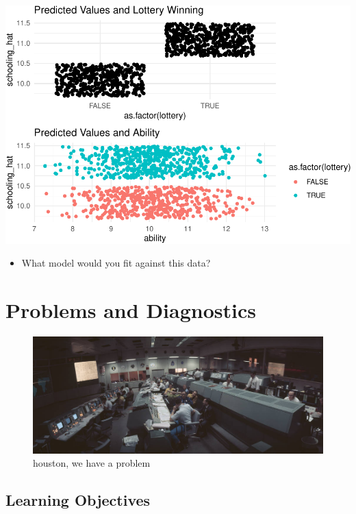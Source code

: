 \documentclass[
]{article}
\providecommand{\tightlist}{%
  \setlength{\itemsep}{0pt}\setlength{\parskip}{0pt}}
\begin{document}
\includegraphics{241-live-session_files/figure-latex/unnamed-chunk-25-1.pdf}

\begin{itemize}
\tightlist
\item
  What model would you fit against this data?
\end{itemize}

\hypertarget{problems-and-diagnostics}{%
\section{Problems and Diagnostics}\label{problems-and-diagnostics}}

\begin{figure}
\centering
\includegraphics{./images/apollo_13.jpeg}
\caption{houston, we have a problem}
\end{figure}

\hypertarget{learning-objectives-10}{%
\subsection{Learning Objectives}\label{learning-objectives-10}}
\end{document}

